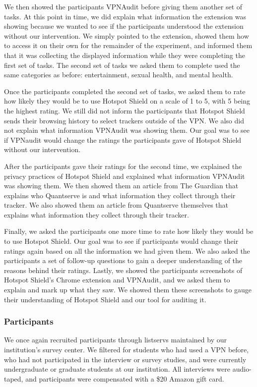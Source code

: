 We then showed the participants VPNAudit before giving them another set of tasks.
At this point in time, we did explain what information the extension was showing because we wanted to see if the participants understood the extension without our intervention.
We simply pointed to the extension, showed them how to access it on their own for the remainder of the experiment, and informed them that it was collecting the displayed information while they were completing the first set of tasks.
The second set of tasks we asked them to complete used the same categories as before: entertainment, sexual health, and mental health.

Once the participants completed the second set of tasks, we asked them to rate how likely they would be to use Hotspot Shield on a scale of 1 to 5, with 5 being the highest rating.
We still did not inform the participants that Hotspot Shield sends their browsing history to select trackers outside of the VPN.
We also did not explain what information VPNAudit was showing them.
Our goal was to see if VPNaudit would change the ratings the participants gave of Hotspot Shield without our intervention.

After the participants gave their ratings for the second time, we explained the privacy practices of Hotspot Shield and explained what information VPNAudit was showing them.
We then showed them an article from The Guardian that explains who Quantserve is and what information they collect through their tracker.
We also showed them an article from Quantserve themselves that explains what information they collect through their tracker.

Finally, we asked the participants one more time to rate how likely they would be to use Hotspot Shield.
Our goal was to see if participants would change their ratings again based on all the information we had given them.
We also asked the participants a set of follow-up questions to gain a deeper understanding of the reasons behind their ratings.
Lastly, we showed the participants screenshots of Hotspot Shield's Chrome extension and VPNAudit, and we asked them to explain and mark up what they saw.
We showed them these screenshots to gauge their understanding of Hotspot Shield and our tool for auditing it.

\subsubsection{Participants} 
We once again recruited participants through listservs maintained by our institution's survey center.
We filtered for students who had used a VPN before, who had not participated in the interview or survey studies, and were currently undergraduate or graduate students at our institution. 
All interviews were audio-taped, and participants were compensated with a \$20 Amazon gift card.

